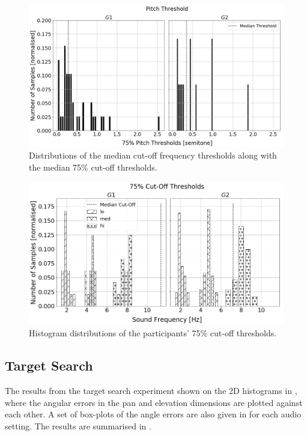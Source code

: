 \documentclass[acmsmall]{acmart}
\begin{document}
\begin{figure}
  \centering
  \includegraphics[width=0.8\columnwidth]{figures/pitch_thresholds.png}
  \caption{Distributions of the median cut-off frequency thresholds along with the median 75\% cut-off thresholds. }\label{fig:pitch-thresholds}
\end{figure}

\begin{figure}
  \centering
  \includegraphics[width=0.8\columnwidth]{figures/pitch_thresholds_limits.png}
  \caption{Histogram distributions of the participants' 75\% cut-off thresholds. }\label{fig:pitch-thresholds-hist}
\end{figure}

\subsection{Target Search}

The results from the target search experiment shown on the 2D histograms in , where the angular errors in the pan and elevation dimensions are plotted against each other. 
A set of box-plots of the angle errors are also given in  for each audio setting.
The results are summarised in .
\end{document}
